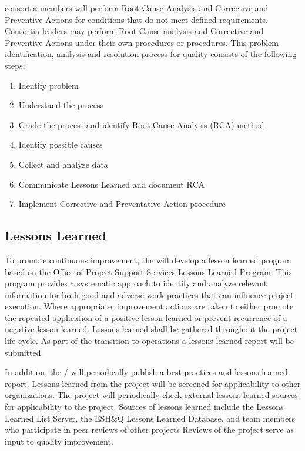  consortia members will perform Root Cause Analysis and Corrective
and Preventive Actions for conditions that do not meet defined
requirements. Consortia leaders may perform Root Cause analysis and
Corrective and Preventive Actions under their own procedures or
\fnal procedures.  This problem identification, analysis and
resolution process for quality consists of the following steps:
\begin{enumerate}
 \item Identify problem
 \item Understand the process
 \item Grade the process and identify Root Cause Analysis (RCA) method
 \item Identify possible causes
 \item Collect and analyze data
 \item Communicate Lessons Learned and document RCA
 \item Implement Corrective and Preventative Action procedure
\end{enumerate}

\subsection{Lessons Learned}

To promote continuous improvement, the   will develop a
lesson learned program based on the \fnal Office of Project Support
Services Lessons Learned Program. This program provides a systematic
approach to identify and analyze relevant information for both good
and adverse work practices that can influence project execution. Where
appropriate, improvement actions are taken to either promote the
repeated application of a positive lesson learned or prevent
recurrence of a negative lesson learned. Lessons learned shall be
gathered throughout the project life cycle. As part of the transition
to operations a lessons learned report will be submitted.

In addition, the /  will
periodically publish a best practices and lessons learned
report. Lessons learned from the  project will be screened
for applicability to other organizations. The  project
will periodically check external lessons learned sources for
applicability to the  project. Sources of lessons learned
include the  Lessons Learned List Server, the \fnal ESH\&Q
Lessons Learned Database, and  team members who
participate in peer reviews of other projects Reviews of the
 project serve as input to quality improvement.

